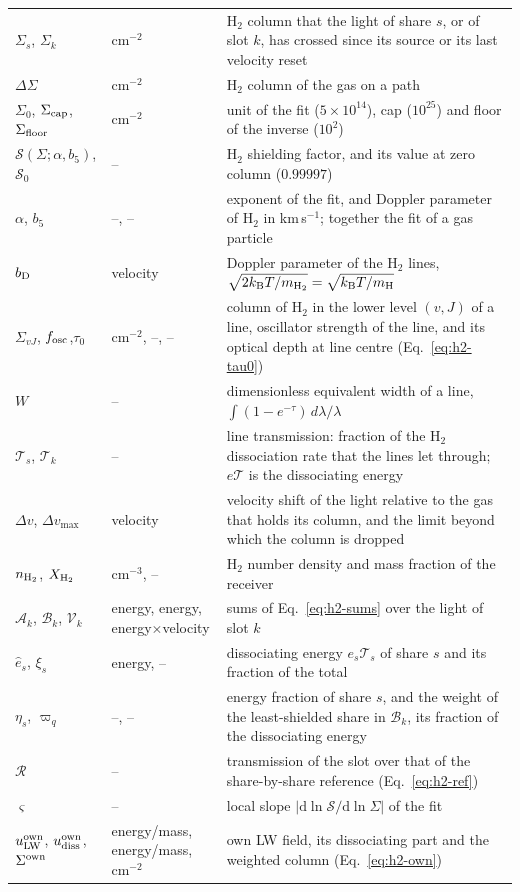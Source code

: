 \begin{longtable}{p{1.9cm}p{3.4cm}p{8.6cm}}
$\Sigma_s$, $\Sigma_k$ & cm$^{-2}$ & H$_2$ column that the light of share $s$, or of slot $k$, has crossed since its source or its last velocity reset \\
$\Delta\Sigma$ & cm$^{-2}$ & H$_2$ column of the gas on a path \\
$\Sigma_0$, $\Sigma_{\rm cap}$, $\Sigma_{\rm floor}$ & cm$^{-2}$ & unit of the fit ($5\times10^{14}$), cap ($10^{25}$) and floor of the inverse ($10^{2}$) \\
$\mathcal S(\Sigma;\alpha,b_5)$, $\mathcal S_0$ & -- & H$_2$ shielding factor, and its value at zero column ($0.99997$) \\
$\alpha$, $b_5$ & --, -- & exponent of the fit, and Doppler parameter of H$_2$ in km\,s$^{-1}$; together the fit of a gas particle \\
$b_{\rm D}$ & velocity & Doppler parameter of the H$_2$ lines, $\sqrt{2k_{\rm B}T/m_{{\rm H}_2}}=\sqrt{k_{\rm B}T/m_{\rm H}}$ \\
$\Sigma_{vJ}$, $f_{\rm osc}$,\newline $\tau_0$ & cm$^{-2}$, --, -- & column of H$_2$ in the lower level $(v,J)$ of a line, oscillator strength of the line, and its optical depth at line centre (Eq.~\eqref{eq:h2-tau0}) \\
$W$ & -- & dimensionless equivalent width of a line, $\int(1-e^{-\tau})\,d\lambda/\lambda$ \\
$\mathcal T_s$, $\mathcal T_k$ & -- & line transmission: fraction of the H$_2$ dissociation rate that the lines let through; $e\mathcal T$ is the dissociating energy \\
$\Delta v$, $\Delta v_{\max}$ & velocity & velocity shift of the light relative to the gas that holds its column, and the limit beyond which the column is dropped \\
$n_{{\rm H}_2}$, $X_{{\rm H}_2}$ & cm$^{-3}$, -- & H$_2$ number density and mass fraction of the receiver \\
$\mathcal A_k$, $\mathcal B_k$, $\mathcal V_k$ & energy, energy, energy$\times$velocity & sums of Eq.~\eqref{eq:h2-sums} over the light of slot $k$ \\
$\hat e_s$, $\xi_s$ & energy, -- & dissociating energy $e_s\mathcal T_s$ of share $s$ and its fraction of the total \\
$\eta_s$, $\varpi_q$ & --, -- & energy fraction of share $s$, and the weight of the least-shielded share in $\mathcal B_k$, its fraction of the dissociating energy \\
$\mathcal R$ & -- & transmission of the slot over that of the share-by-share reference (Eq.~\eqref{eq:h2-ref}) \\
$\varsigma$ & -- & local slope $|\mathrm d\ln\mathcal S/\mathrm d\ln\Sigma|$ of the fit \\
$u_{\rm LW}^{\rm own}$, $u_{\rm diss}^{\rm own}$, $\Sigma^{\rm own}$ & energy/mass, energy/mass, cm$^{-2}$ & own LW field, its dissociating part and the weighted column (Eq.~\eqref{eq:h2-own}) \\
\bottomrule
\end{longtable}

